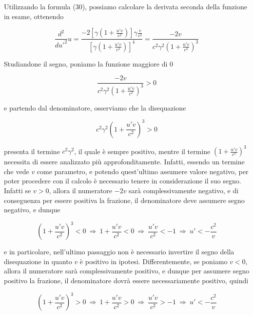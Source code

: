 \documentclass{article}
\begin{document}
Utilizzando la formula (30), possiamo calcolare la derivata
seconda della funzione in esame, ottenendo

\begin{equation}
    \frac{d^2}{du'^2} u = \frac{-2\left[\gamma \left(1 + \frac{u'v}{c^2}\right)\right] \gamma \frac{v}{c^2}}{\left[\gamma \left(1 + \frac{u'v}{c^2}\right)\right]^4} = \frac{-2v}{c^2\gamma^2 \left(1 + \frac{u'v}{c^2}\right)^3}
\end{equation}

Studiandone il segno, poniamo la funzione maggiore di 0

\begin{equation}
    \frac{-2v}{c^2\gamma^2 \left(1 + \frac{u'v}{c^2}\right)^3} > 0
\end{equation}

e partendo dal denominatore,
osserviamo che la disequazione

\begin{equation}
    c^2\gamma^2 \left(1 + \frac{u'v}{c^2}\right)^3 > 0
\end{equation}

presenta il termine \(c^2 \gamma^2\),
il quale è sempre positivo, mentre il termine
\(\left(1 + \frac{u'v}{c^2}\right)^3\)
necessita di essere analizzato più approfonditamente.
Infatti, essendo un termine che vede \(v\)
come parametro, e potendo quest'ultimo assumere valore negativo,
per poter procedere con il calcolo è necessario
tenere in considerazione il suo segno. Infatti se \(v > 0\),
allora il numeratore \(-2v\) sarà complessivamente negativo, e
di conseguenza per essere positiva la frazione, il
denominatore deve assumere segno negativo, e dunque

\begin{equation}
    \left(1 + \frac{u'v}{c^2}\right)^3 < 0\ \Rightarrow\ 1 + \frac{u'v}{c^2} < 0\ \Rightarrow\ \frac{u'v}{c^2} < -1\ \Rightarrow\ u' < - \frac{c^2}{v}
\end{equation}

e in particolare, nell'ultimo passaggio non è
necessario invertire il segno della disequazione in
quanto \(v\) è positivo in ipotesi. Differentemente,
se poniamo \(v < 0\), allora il numeratore sarà
complessivamente positivo, e dunque per assumere
segno positivo la frazione, il denominatore dovrà
essere necessariamente positivo, quindi

\begin{equation}
    \left(1 + \frac{u'v}{c^2}\right)^3 > 0\ \Rightarrow\ 1 + \frac{u'v}{c^2} > 0\ \Rightarrow\ \frac{u'v}{c^2} > -1\ \Rightarrow\ u' < - \frac{c^2}{v}
\end{equation}
\end{document}
